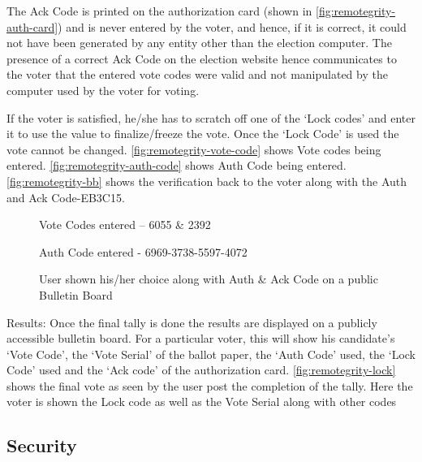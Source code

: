 The Ack Code is printed on the authorization card (shown in \autoref{fig:remotegrity-auth-card}) and is never entered by the voter, and hence, if it is correct, it could not have been generated by any entity other than the election computer. The presence of a correct Ack Code on the election website hence communicates to the voter that the entered vote codes were valid and not manipulated by the computer used by the voter for voting.

If the voter is satisfied, he/she has to scratch off one of the `Lock codes' and enter it to use the value to finalize/freeze the vote. Once the `Lock Code' is used the vote cannot be changed. \autoref{fig:remotegrity-vote-code} shows Vote codes being entered. \autoref{fig:remotegrity-auth-code} shows Auth Code being entered. \autoref{fig:remotegrity-bb} shows the verification back to the voter along with the Auth and Ack Code-EB3C15.

\begin{figure}
  \centering
  \caption{Vote Codes entered -- 6055 \& 2392}
  \label{fig:remotegrity-vote-code}
\end{figure}

\begin{figure}
  \centering
  \caption{Auth Code entered - 6969-3738-5597-4072}
  \label{fig:remotegrity-auth-code}
\end{figure}

\begin{figure}
  \centering
  \caption{User shown his/her choice along with Auth \& Ack Code on a public Bulletin Board}
  \label{fig:remotegrity-bb}
\end{figure}

Results: Once the final tally is done the results are displayed on a publicly accessible bulletin board. For a particular voter, this will show his candidate's `Vote Code', the `Vote Serial' of the ballot paper, the `Auth Code' used, the `Lock Code' used and the `Ack code' of the authorization card. \autoref{fig:remotegrity-lock} shows the final vote as seen by the user post the completion of the tally. Here the voter is shown the Lock code as well as the Vote Serial along with other codes

\subsection{Security}

